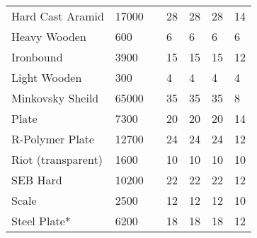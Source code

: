 \documentclass[twoside]{book}
\begin{document}
\begin{longtable}{p{1.25in}llp{3em}p{3em}p{3em}p{3em}}
      \raggedright Hard Cast Aramid&17000&&28&28&28&14\tabularnewline
      \raggedright Heavy Wooden&600&&6&6&6&6\tabularnewline
      \raggedright Ironbound&3900&&15&15&15&12\tabularnewline
      \raggedright Light Wooden&300&&4&4&4&4\tabularnewline
      \raggedright Minkovsky Sheild&65000&&35&35&35&8\tabularnewline
      \raggedright Plate&7300&&20&20&20&14\tabularnewline
      \raggedright R-Polymer Plate&12700&&24&24&24&12\tabularnewline
      \raggedright Riot (transparent)&1600&&10&10&10&10\tabularnewline
      \raggedright SEB Hard&10200&&22&22&22&12\tabularnewline
      \raggedright Scale&2500&&12&12&12&10\tabularnewline
      \raggedright Steel Plate*&6200&&18&18&18&12\tabularnewline
      
\end{longtable}
    
\begin{multicols}{2}


\hspace{-3.75ex}
\vspace{1ex}


    


\hspace{-2ex}
\vspace{1ex}


    


\hspace{-2ex}
\vspace{1ex}


    


\hspace{-2ex}
\vspace{1ex}


    


\hspace{-2ex}
\vspace{1ex}


    


\hspace{-2ex}
\vspace{1ex}


    



\end{multicols}
\end{document}
